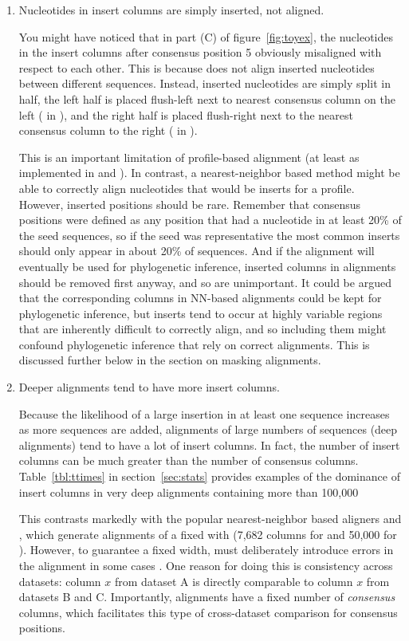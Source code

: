 \begin{enumerate}
\item 
Nucleotides in insert columns are simply inserted, not aligned.

You might have noticed that in part (C) of figure~\ref{fig:toyex}, the
nucleotides in the insert columns after consensus position 5 obviously
misaligned with respect to each other. This is because 
does not align inserted nucleotides between different
sequences. Instead, inserted nucleotides are simply split in half, the
left half is placed flush-left next to nearest consensus column on the
left ( in ), and the right half is placed
flush-right next to the nearest consensus column to the right
( in ). 

This is an important limitation of
profile-based alignment (at least as implemented in  and
). In contrast, a nearest-neighbor based method might
be able to correctly align nucleotides that would be inserts for a
profile. However, inserted positions should be rare. Remember that
consensus positions were defined as any position that had a nucleotide
in at least 20\% of the seed sequences, so if the seed was
representative the most common inserts should only appear in about
20\% of sequences. And if the alignment will eventually be used for
phylogenetic inference, inserted columns in  alignments
should be removed first anyway, and so are unimportant. 
It could be argued that the corresponding columns in NN-based
alignments could be kept for phylogenetic inference, but inserts tend
to occur at highly variable regions that are inherently difficult to
correctly align, and so including them might confound phylogenetic
inference that rely on correct alignments. This is
discussed further below in the section on masking alignments.

\item 
Deeper alignments tend to have more insert columns. 

Because the likelihood of a large insertion in at least one sequence
increases as more sequences are added, alignments of large numbers of
sequences (deep alignments) tend to have a lot of insert columns. In
fact, the number of insert columns can be much greater than the number
of consensus columns. Table~\ref{tbl:ttimes} in
section~\ref{sec:stats} provides examples of the dominance of insert
columns in very deep alignments containing more than 100,000

This contrasts markedly with the popular nearest-neighbor based
aligners  and , which generate alignments of a
fixed with (7,682 columns for  and 50,000 for
). However, to guarantee a fixed width,  must
deliberately introduce errors in the alignment in some cases
\cite{DeSantis06}. One reason for doing this is consistency across
datasets: column $x$ from dataset A is directly comparable to column
$x$ from datasets B and C. Importantly,  alignments
have a fixed number of \emph{consensus} columns, which facilitates this
type of cross-dataset comparison for consensus positions.
\end{enumerate} 

